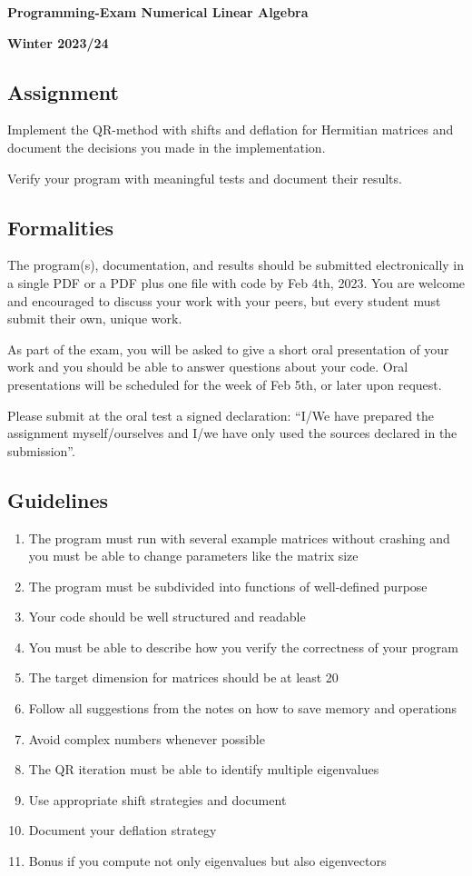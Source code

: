 \documentclass[a4paper]{article}
\begin{document}
\begin{center}
  \textbf{\Large Programming-Exam Numerical Linear Algebra}
  
  \textbf{Winter 2023/24}
\end{center}

\subsection*{Assignment}

Implement the QR-method with shifts and deflation for Hermitian
matrices and document the decisions you made in the implementation.

Verify your program with meaningful tests and document their results.

\subsection*{Formalities}

The program(s), documentation, and results should be submitted
electronically in a single PDF or a PDF plus one file with code by Feb
4th, 2023. You are welcome and encouraged to discuss your work with
your peers, but every student must submit their own, unique work.

As part of the exam, you will be asked to give a short oral
presentation of your work and you should be able to answer questions
about your code.  Oral presentations will be scheduled for the week of
Feb 5th, or later upon request.

Please submit at the oral test a signed declaration: ``I/We have
  prepared the assignment myself/ourselves and I/we have only used the
  sources declared in the submission''.

\subsection*{Guidelines}
\begin{enumerate}
\item The program must run with several example matrices without
  crashing and you must be able to change parameters like the matrix
  size
\item The program must be subdivided into functions of well-defined
  purpose
\item Your code should be well structured and readable
\item You must be able to describe how you verify the correctness of
  your program
\item The target dimension for matrices should be at least 20
\item Follow all suggestions from the notes on how to save memory and operations
\item Avoid complex numbers whenever possible
\item The QR iteration must be able to identify multiple eigenvalues
\item Use appropriate shift strategies and document
\item Document your deflation strategy
\item Bonus if you compute not only eigenvalues but also eigenvectors
\end{enumerate}
\end{document}
